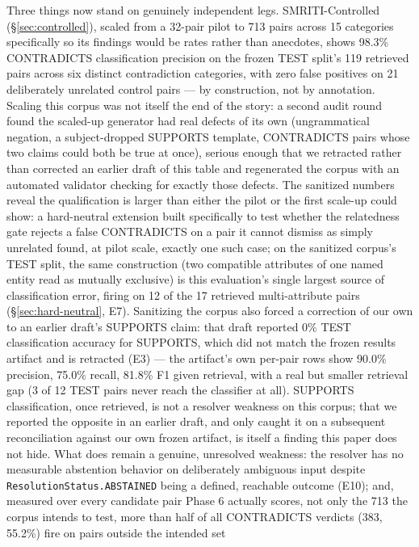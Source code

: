 Three things now stand on genuinely independent legs. SMRITI-Controlled
(\S\ref{sec:controlled}), scaled from a 32-pair pilot to 713 pairs across
15 categories specifically so its findings would be rates rather than
anecdotes, shows 98.3\% CONTRADICTS classification precision on the
frozen TEST split's 119 retrieved pairs across six distinct contradiction
categories, with zero false positives on 21 deliberately unrelated
control pairs --- by construction, not by annotation. Scaling this
corpus was not itself the end of the story: a second audit round
found the scaled-up generator had real defects of its own (ungrammatical
negation, a subject-dropped SUPPORTS template, CONTRADICTS pairs whose
two claims could both be true at once), serious enough that we retracted
rather than corrected an earlier draft of this table and regenerated the
corpus with an automated validator checking for exactly those defects.
The sanitized numbers reveal the qualification is larger than either the
pilot or the first scale-up could show: a hard-neutral extension built
specifically to test whether the relatedness gate rejects a false
CONTRADICTS on a pair it cannot dismiss as simply unrelated found, at
pilot scale, exactly one such case; on the sanitized corpus's TEST split,
the same construction (two compatible attributes of one named entity
read as mutually exclusive) is this evaluation's single largest source
of classification error, firing on 12 of the 17 retrieved
multi-attribute pairs (\S\ref{sec:hard-neutral}, E7). Sanitizing the
corpus also forced a correction of our own to an earlier draft's
SUPPORTS claim: that draft reported 0\% TEST classification accuracy for
SUPPORTS, which did not match the frozen results artifact and is
retracted (E3) --- the artifact's own per-pair rows show 90.0\%
precision, 75.0\% recall, 81.8\% F1 given retrieval, with a real but
smaller retrieval gap (3 of 12 TEST pairs never reach the classifier at
all). SUPPORTS classification, once retrieved, is not a resolver
weakness on this corpus; that we reported the opposite in an earlier
draft, and only caught it on a subsequent reconciliation against our own
frozen artifact, is itself a finding this paper does not hide. What does
remain a genuine, unresolved weakness: the resolver has no measurable
abstention behavior on deliberately ambiguous input despite
\texttt{ResolutionStatus.ABSTAINED} being a defined, reachable outcome
(E10); and, measured over every candidate pair Phase 6 actually scores,
not only the 713 the corpus intends to test, more than half of all
CONTRADICTS verdicts (383, 55.2\%) fire on pairs outside the intended set
